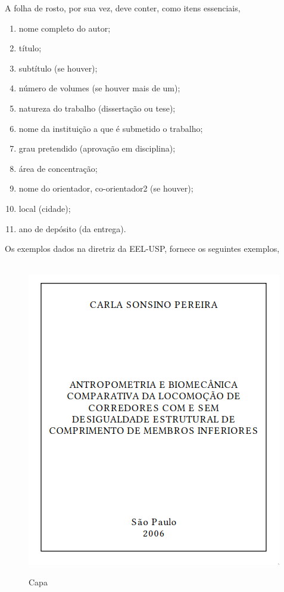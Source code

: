 \documentclass[a4paper,11pt]{abntex2}
\theoremstyle{mytheor}
\begin{document}
  A folha de rosto, por sua vez, deve conter, como itens essenciais,

  \begin{enumerate}
  \item  nome completo do autor;
  \item  título;
  \item  subtítulo (se houver);
  \item  número de volumes (se houver mais de um);
  \item  natureza do trabalho (dissertação ou tese);
  \item nome da instituição a que é submetido o trabalho;
  \item  grau pretendido (aprovação em disciplina);
  \item área de concentração;
  \item  nome do orientador, co-orientador2 (se houver);
  \item  local (cidade);
  \item  ano de depósito (da entrega).
  \end{enumerate}

  \clearpage
  Os exemplos dados na diretriz da EEL-USP, fornece os seguintes
  exemplos,

  \begin{figure}[!htb]
    \begin{center}
      \caption{\label{fig:cp} Capa}\\

      \includegraphics[scale=0.5]{./imagens/2.png} \\

    \end{center}
  \end{figure}
\end{document}
